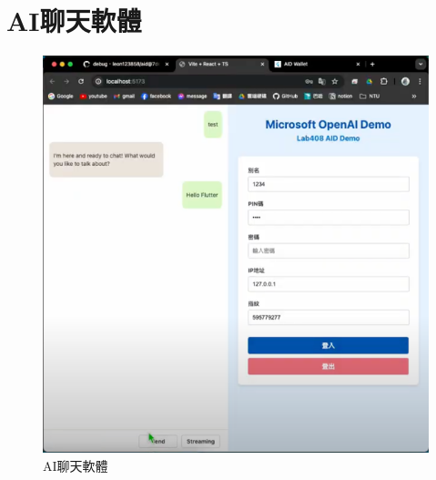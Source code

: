 \section{AI聊天軟體}
\begin{figure}
  \centering
  \includegraphics[width=\linewidth]{figures/AI-demo.png}
  \caption{AI聊天軟體}
\end{figure}

